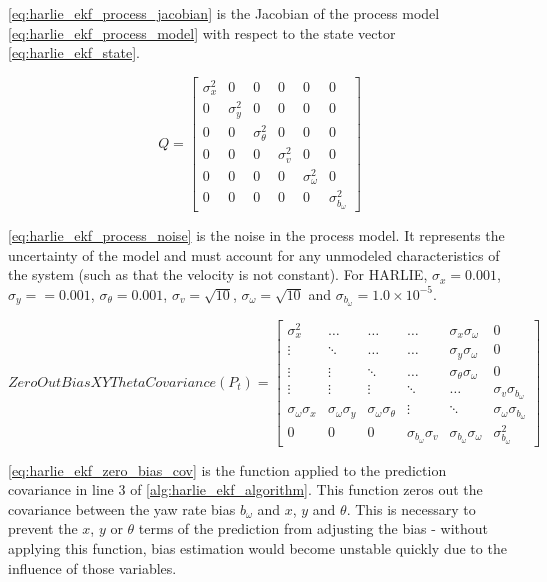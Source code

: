 \eqref{eq:harlie_ekf_process_jacobian} is the Jacobian of the process model \eqref{eq:harlie_ekf_process_model} with respect to the state vector \eqref{eq:harlie_ekf_state}.

\begin{equation}
	Q =
	\begin{bmatrix}
		\sigma_{x}^2 & 0 & 0 & 0 & 0 & 0 \\
		0 & \sigma_{y}^2 & 0 & 0 & 0 & 0 \\
		0 & 0 & \sigma_{\theta}^2 & 0 & 0 & 0 \\
		0 & 0 & 0 & \sigma_{v}^2 & 0 & 0 \\
		0 & 0 & 0 & 0 & \sigma_{\omega}^2 & 0 \\
		0 & 0 & 0 & 0 & 0 & \sigma_{b_{\omega}}^2
	\end{bmatrix}
	\label{eq:harlie_ekf_process_noise}
\end{equation}

\eqref{eq:harlie_ekf_process_noise} is the noise in the process model. It represents the uncertainty of the model and must account for any unmodeled characteristics of the system (such as that the velocity is not constant). For HARLIE, $\sigma_{x} = 0.001$, $\sigma_{y} == 0.001$, $\sigma_{\theta} = 0.001$, $\sigma_{v} = \sqrt{10}$, $\sigma_{\omega} = \sqrt{10}$ and $\sigma_{b_{\omega}} = 1.0\times 10^{-5}$.

\begin{equation}
	ZeroOutBiasXYThetaCovariance\left(P_t\right) = 
	\begin{bmatrix}
		\sigma_x^2 & \ldots & \ldots & \ldots & \sigma_x\sigma_\omega & 0 \\
		\vdots & \ddots & \ldots & \ldots & \sigma_y\sigma_\omega & 0 \\
		\vdots & \vdots & \ddots & \ldots & \sigma_\theta\sigma_\omega & 0 \\
		\vdots & \vdots & \vdots & \ddots & \ldots & \sigma_v\sigma_{b_{\omega}} \\
		\sigma_\omega\sigma_x & \sigma_\omega\sigma_y & \sigma_\omega\sigma_\theta & \vdots & \ddots & \sigma_\omega\sigma_{b_{\omega}} \\
		0 & 0 & 0 & \sigma_{b_{\omega}}\sigma_v & \sigma_{b_{\omega}}\sigma_\omega & \sigma_{b_{\omega}}^2
	\end{bmatrix}
	\label{eq:harlie_ekf_zero_bias_cov}
\end{equation}

\eqref{eq:harlie_ekf_zero_bias_cov} is the function applied to the prediction covariance in line 3 of \autoref{alg:harlie_ekf_algorithm}. This function zeros out the covariance between the yaw rate bias $b_{\omega}$ and $x$, $y$ and $\theta$. This is necessary to prevent the $x$, $y$ or $\theta$ terms of the prediction from adjusting the bias - without applying this function, bias estimation would become unstable quickly due to the influence of those variables.

